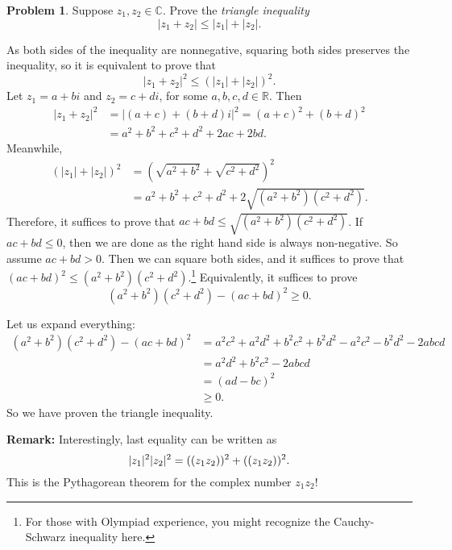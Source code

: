 \documentclass[11pt,oneside]{amsart}
\theoremstyle{definition}
\newtheorem{problem}{Problem}
\newcommand{\bC}{\mathbb{C}}
\newcommand{\bR}{\mathbb{R}}
\let\Re\relax
\let\Im\relax
\DeclareMathOperator{\Re}{Re}
\DeclareMathOperator{\Im}{Im}
\begin{document}
    \begin{problem}
        Suppose $z_1,z_2\in\bC$. Prove the \emph{triangle inequality}
        \[|z_1+z_2|\leq |z_1|+|z_2|.\]
    \end{problem}
    \begin{solution}
        As both sides of the inequality are nonnegative, squaring both sides preserves the inequality, so it is equivalent to prove that
        \[|z_1+z_2|^2\leq (|z_1|+|z_2|)^2.\]
        Let $z_1=a+bi$ and $z_2=c+di$, for some $a,b,c,d\in\bR$. Then
        \[\begin{split}
            |z_1+z_2|^2 &= |(a+c)+(b+d)i|^2 = (a+c)^2+(b+d)^2 \\
            &= a^2+b^2+c^2+d^2+2ac+2bd.
        \end{split}\]
        Meanwhile,
        \[\begin{split}
            (|z_1|+|z_2|)^2 &= \left(\sqrt{a^2+b^2}+\sqrt{c^2+d^2}\right)^2\\
            &= a^2+b^2+c^2+d^2+2\sqrt{(a^2+b^2)(c^2+d^2)}.
        \end{split}\]
        Therefore, it suffices to prove that $ac+bd\leq \sqrt{(a^2+b^2)(c^2+d^2)}$. If $ac+bd\leq 0$, then we are done as the right hand side is always non-negative. So assume $ac+bd>0$. Then we can square both sides, and it suffices to prove that $(ac+bd)^2\leq (a^2+b^2)(c^2+d^2)$.\footnote{For those with Olympiad experience, you might recognize the Cauchy-Schwarz inequality here.} Equivalently, it suffices to prove
        \[(a^2+b^2)(c^2+d^2)-(ac+bd)^2\geq 0.\]

        Let us expand everything:
        \[\begin{split}
            (a^2+b^2)(c^2+d^2)-(ac+bd)^2 &= a^2c^2+a^2d^2+b^2c^2+b^2d^2-a^2c^2-b^2d^2-2abcd\\
            &= a^2d^2+b^2c^2-2abcd\\
            &= (ad-bc)^2\\
            &\geq 0.
        \end{split}\]
        So we have proven the triangle inequality.

        \textbf{Remark:} Interestingly, last equality can be written as
        \[|z_1|^2|z_2|^2=(\Re(z_1z_2))^2+(\Im(z_1z_2))^2.\]
        This is the Pythagorean theorem for the complex number $z_1z_2$!
    \end{solution}
\end{document}
